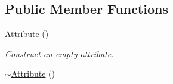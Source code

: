 \subsection*{Public Member Functions}
\begin{DoxyCompactItemize}
\item 
\hypertarget{classphys_1_1xml_1_1Attribute_a962ad273e447bb714925c331e00cc3e7}{
\hyperlink{classphys_1_1xml_1_1Attribute_a962ad273e447bb714925c331e00cc3e7}{Attribute} ()}
\label{da/ddf/classphys_1_1xml_1_1Attribute_a962ad273e447bb714925c331e00cc3e7}

\begin{DoxyCompactList}\small\item\em Construct an empty attribute. \item\end{DoxyCompactList}\item 
\hypertarget{classphys_1_1xml_1_1Attribute_a2918dbce8208751944d3803a1300a914}{
\hyperlink{classphys_1_1xml_1_1Attribute_a2918dbce8208751944d3803a1300a914}{$\sim$Attribute} ()}
\label{da/ddf/classphys_1_1xml_1_1Attribute_a2918dbce8208751944d3803a1300a914}


\end{DoxyCompactItemize}
